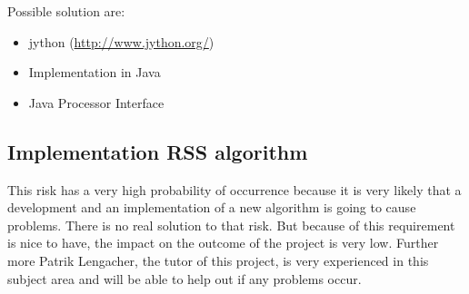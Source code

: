 Possible solution are:
\begin{itemize}
\item jython (\url{http://www.jython.org/})
\item Implementation in Java
\item Java Processor Interface 
\end{itemize}


\subsection{Implementation RSS algorithm}

This risk has a very high probability of occurrence because it is very likely that a development and an implementation of a new algorithm is going to cause problems. There is no real solution to that risk. But because of this requirement is nice to have, the impact on the outcome of the project is very low. Further more Patrik Lengacher, the tutor of this project, is very experienced in this subject area and will be able to help out if any problems occur. 